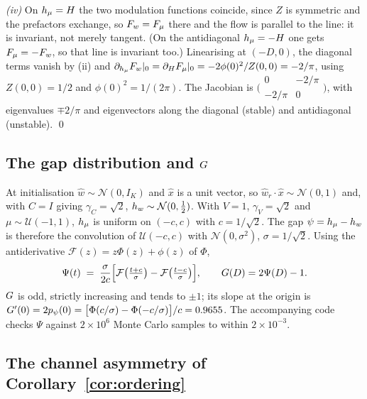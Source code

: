 \emph{(iv)} On $h_{\mu}=H$ the two modulation functions coincide, since $Z$ is
symmetric and the prefactors exchange, so $F_{w}=F_{\mu}$ there and the flow is
parallel to the line: it is invariant, not merely tangent. (On the antidiagonal
$h_{\mu}=-H$ one gets $F_{\mu}=-F_{w}$, so that line is invariant too.) Linearising at
$(-D,0)$, the diagonal terms vanish by (ii) and
$\partial_{h_{\mu}}F_{w}|_0=\partial_{H}F_{\mu}|_0=-2\phi(0)^2/Z(0,0)=-2/\pi$, using
$Z(0,0)=1/2$ and $\phi(0)^2=1/(2\pi)$. The Jacobian is
$\bigl(\begin{smallmatrix}0&-2/\pi\\-2/\pi&0\end{smallmatrix}\bigr)$, with
eigenvalues $\mp2/\pi$ and eigenvectors along the diagonal (stable) and
antidiagonal (unstable). \qed

\subsection{The gap distribution and $G$}
\label{app:gap}

At initialisation $\hat{w}\sim\mathcal{N}(0,I_K)$ and $\hat{x}$ is a unit vector,
so $\hat{w}_r\!\cdot\!\hat{x}\sim\mathcal{N}(0,1)$ and, with $C=I$ giving
$\gamma_C=\sqrt2$, $h_{w}\sim\mathcal{N}(0,\tfrac12)$. With $V=1$,
$\gamma_V=\sqrt2$ and $\mu\sim\mathcal{U}(-1,1)$, $h_{\mu}$ is uniform on
$(-c,c)$ with $c=1/\sqrt2$. The gap $\psi=h_{\mu}-h_{w}$ is therefore the convolution
of $\mathcal{U}(-c,c)$ with $\mathcal{N}(0,\sigma^2)$, $\sigma=1/\sqrt2$. Using
the antiderivative $\mathcal{F}(z)=z\Phi(z)+\phi(z)$ of $\Phi$,
%
\begin{equation}
  \Psi(t) \;=\; \frac{\sigma}{2c}\Bigl[\mathcal{F}\bigl(\tfrac{t+c}{\sigma}\bigr)
  - \mathcal{F}\bigl(\tfrac{t-c}{\sigma}\bigr)\Bigr],
  \qquad
  G(D)=2\Psi(D)-1 .
\end{equation}
%
$G$ is odd, strictly increasing and tends to $\pm1$; its slope at the origin
is $G'(0)=2p_\psi(0)=\bigl[\Phi(c/\sigma)-\Phi(-c/\sigma)\bigr]/c=0.9655$.
The accompanying code checks $\Psi$ against $2\times10^{6}$ Monte Carlo samples
to within $2\times10^{-3}$.

\subsection{The channel asymmetry of Corollary~\ref{cor:ordering}}


